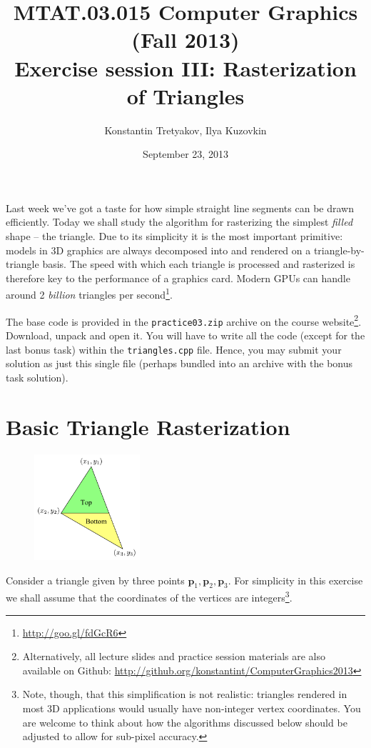 \documentclass{article}
\newcommand{\bp}{\mathbf{p}}
\begin{document}
\title{MTAT.03.015 Computer Graphics (Fall 2013)\\
Exercise session III: Rasterization of Triangles}
\author{Konstantin Tretyakov, Ilya Kuzovkin}
\date{September 23, 2013}
\maketitle

Last week we've got a taste for how simple straight line segments can be drawn efficiently. Today we shall study the algorithm for rasterizing the simplest \emph{filled} shape -- the triangle. Due to its simplicity it is the most important primitive: models in 3D graphics are always decomposed into and rendered on a triangle-by-triangle basis. The speed with which each triangle is processed and rasterized is therefore key to the performance of a graphics card. Modern GPUs can handle around 2 \emph{billion} triangles per second\footnote{\url{http://goo.gl/fdGcR6}}.

The base code is provided in the \texttt{practice03.zip} archive on the course website\footnote{Alternatively, all lecture slides and practice session materials are also available on Github: \url{http://github.org/konstantint/ComputerGraphics2013}}. Download, unpack and open it. You will have to write all the code (except for the last bonus task) within the \texttt{triangles.cpp} file. Hence, you may submit your solution as just this single file (perhaps bundled into an archive with the bonus task solution).

\section{Basic Triangle Rasterization}


\begin{figure}
\centering
\includegraphics[width=0.35\textwidth]{triangle.pdf}
\end{figure}

Consider a triangle given by three points $\bp_1, \bp_2, \bp_3$. For simplicity in this exercise we shall assume that the coordinates of the vertices are integers\footnote{Note, though, that this simplification is not realistic: triangles rendered in most 3D applications would usually have non-integer vertex coordinates. You are welcome to think about how the algorithms discussed below should be adjusted to allow for sub-pixel accuracy.}.
\end{document}
